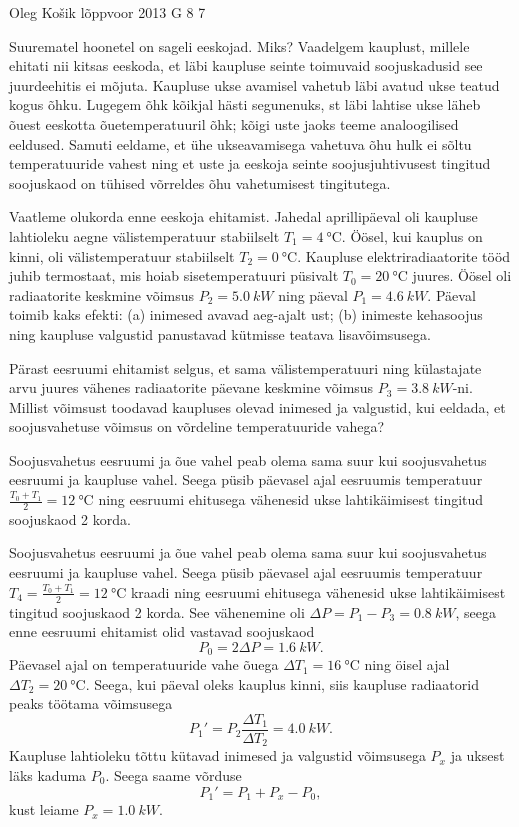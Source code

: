{Oleg Košik} %
{lõppvoor} %
{2013} %
{G 8} %
{7} %
{
\ifStatement
Suurematel hoonetel on sageli eeskojad. Miks? 
Vaadelgem kauplust, millele ehitati nii kitsas eeskoda, et
läbi kaupluse seinte toimuvaid soojuskadusid see juurdeehitis ei
mõjuta. Kaupluse ukse avamisel vahetub läbi avatud ukse teatud kogus õhku.
Lugegem õhk kõikjal hästi segunenuks, st läbi lahtise
ukse läheb õuest eeskotta õuetemperatuuril õhk; kõigi uste jaoks teeme
analoogilised eeldused. Samuti
eeldame, et ühe
ukseavamisega vahetuva õhu hulk ei sõltu temperatuuride vahest ning et uste ja
eeskoja seinte soojusjuhtivusest tingitud soojuskaod on tühised võrreldes õhu
vahetumisest tingitutega.

Vaatleme olukorda enne eeskoja ehitamist. Jahedal aprillipäeval oli kaupluse
lahtioleku aegne välistemperatuur stabiilselt $T_1=\SI{4}{\celsius}$. Öösel, kui kauplus
on kinni, oli välistemperatuur stabiilselt $T_2=\SI{0}{\celsius}$. Kaupluse
elektriradiaatorite tööd juhib termostaat, mis hoiab sisetemperatuuri püsivalt
$T_0=\SI{20}{\celsius}$ juures.
Öösel oli radiaatorite keskmine võimsus $P_2= \SI{5,0}{kW}$
ning päeval $P_1=\SI{4,6}{kW}$. Päeval toimib kaks efekti: (a) inimesed avavad
aeg-ajalt ust; (b) inimeste kehasoojus ning kaupluse valgustid panustavad
kütmisse teatava lisavõimsusega. 

Pärast eesruumi ehitamist selgus, et sama välistemperatuuri ning
külastajate arvu juures vähenes radiaatorite päevane keskmine võimsus
\mbox{$P_3=\SI{3,8}{kW}$-ni.} Millist võimsust toodavad kaupluses olevad
inimesed ja valgustid, kui eeldada, et soojusvahetuse võimsus on võrdeline
temperatuuride vahega? 
\fi


\ifHint
Soojusvahetus eesruumi ja õue vahel peab olema sama suur kui soojusvahetus eesruumi ja kaupluse vahel. Seega püsib päevasel ajal eesruumis temperatuur $\frac{T_0+T_1}{2}=\SI{12}{\celsius}$ ning eesruumi ehitusega vähenesid ukse lahtikäimisest tingitud soojuskaod 2 korda.
\fi


\ifSolution
Soojusvahetus eesruumi ja õue vahel peab olema sama suur kui soojusvahetus eesruumi ja kaupluse vahel. Seega püsib päevasel ajal eesruumis temperatuur $T_4=\frac{T_0+T_1}{2}=\SI{12}{\celsius}$ kraadi ning eesruumi ehitusega vähenesid ukse lahtikäimisest tingitud soojuskaod 2 korda. See vähenemine oli $\Delta P=P_1-P_3=\SI{0,8}{kW}$, seega enne eesruumi ehitamist olid vastavad soojuskaod
\[
P_0=2\Delta P=\SI{1,6}{kW}.
\]
Päevasel ajal on temperatuuride vahe õuega $\Delta T_1=\SI{16}{\celsius}$ ning öisel ajal $\Delta T_2=\SI{20}{\celsius}$. Seega, kui päeval oleks kauplus kinni, siis kaupluse radiaatorid peaks töötama võimsusega
\[
P_1'=P_2\frac{\Delta T_1}{\Delta T_2}=\SI{4,0}{kW}.
\]
Kaupluse lahtioleku tõttu kütavad inimesed ja valgustid võimsusega $P_x$ ja uksest läks kaduma $P_0$. Seega saame võrduse
\[
P_1'=P_1+P_x-P_0,
\]
kust leiame $P_x=\SI{1,0}{kW}$.
\fi


}
